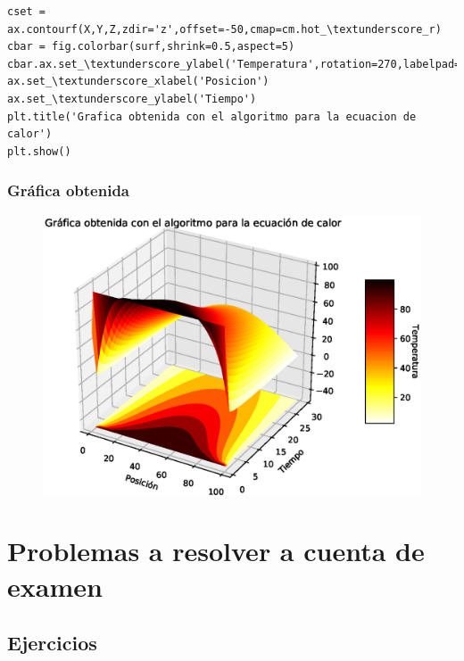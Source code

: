 \documentclass[12pt]{beamer}
\begin{document}
{\begin{frame}
\begin{lstlisting}[caption=Rutina para graficar los resultados, style=FormattedNumber, basicstyle=\linespread{1.1}\ttfamily=\small, columns=fullflexible]
cset = ax.contourf(X,Y,Z,zdir='z',offset=-50,cmap=cm.hot_\textunderscore_r)
cbar = fig.colorbar(surf,shrink=0.5,aspect=5)
cbar.ax.set_\textunderscore_ylabel('Temperatura',rotation=270,labelpad=10)
ax.set_\textunderscore_xlabel('Posicion')
ax.set_\textunderscore_ylabel('Tiempo')
plt.title('Grafica obtenida con el algoritmo para la ecuacion de calor')
plt.show()
\end{lstlisting}
\end{frame}
\begin{frame}
\frametitle{Gráfica obtenida}
\begin{figure}
	\centering
	\includegraphics[scale=0.55]{Imagenes/SolucionEcuacionCalor_01.eps}  
\end{figure}
\end{frame}
}

\section{Problemas a resolver a cuenta de examen}
\subsection{Ejercicios}
\end{document}
